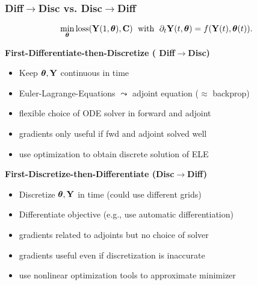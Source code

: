 \documentclass[12pt,fleqn, beamer]{beamer}
\begin{document}
	\begin{frame}
		\frametitle{ Diff$\rightarrow$Disc vs. Disc$\rightarrow$Diff  \cite{Onken2020DO}}
		\begin{equation*}
			\min_{{\boldsymbol \theta}} {\rm loss}({\bf Y}(1,{\boldsymbol \theta}), {\bf C}) \; \text{ with } \; \partial_t {\bf Y}(t,{\boldsymbol \theta}) = f({\bf Y}(t),{\boldsymbol \theta}(t)).
		\end{equation*}
	 	
		\pause
			\textbf{First-Differentiate-then-Discretize ( Diff$\rightarrow$Disc)}
			\begin{itemize}
				\item Keep ${\boldsymbol \theta}, {\bf Y}$ continuous in time
				\item Euler-Lagrange-Equations $\leadsto$ adjoint equation ($\approx$ backprop)
				\item flexible choice of ODE solver in forward and adjoint
				\item gradients only useful if fwd and adjoint solved well
				
				\item use optimization to obtain discrete solution of ELE
			\end{itemize}
			\pause
			\bigskip
			
			{\textbf{First-Discretize-then-Differentiate (Disc$\rightarrow$Diff)}}
			\begin{itemize}
				\item Discretize ${\boldsymbol \theta}, {\bf Y}$ in time (could use different grids)
				\item Differentiate objective (e.g., use automatic differentiation)
				\item gradients related to adjoints but no choice of solver
				\item gradients useful even if discretization is inaccurate 
				\item use nonlinear optimization tools to approximate minimizer
			\end{itemize}
		
	\end{frame}
	
\end{document}
